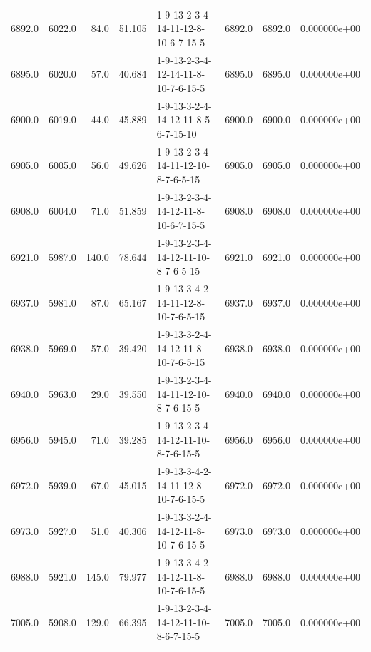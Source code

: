 \begin{tabular}{rrrrlrrr}
 6892.0 &  6022.0 &           84.0 &             51.105 &  1-9-13-2-3-4-14-11-12-8-10-6-7-15-5 &        6892.0 &          6892.0 &  0.000000e+00 \\
 6895.0 &  6020.0 &           57.0 &             40.684 &  1-9-13-2-3-4-12-14-11-8-10-7-6-15-5 &        6895.0 &          6895.0 &  0.000000e+00 \\
 6900.0 &  6019.0 &           44.0 &             45.889 &  1-9-13-3-2-4-14-12-11-8-5-6-7-15-10 &        6900.0 &          6900.0 &  0.000000e+00 \\
 6905.0 &  6005.0 &           56.0 &             49.626 &  1-9-13-2-3-4-14-11-12-10-8-7-6-5-15 &        6905.0 &          6905.0 &  0.000000e+00 \\
 6908.0 &  6004.0 &           71.0 &             51.859 &  1-9-13-2-3-4-14-12-11-8-10-6-7-15-5 &        6908.0 &          6908.0 &  0.000000e+00 \\
 6921.0 &  5987.0 &          140.0 &             78.644 &  1-9-13-2-3-4-14-12-11-10-8-7-6-5-15 &        6921.0 &          6921.0 &  0.000000e+00 \\
 6937.0 &  5981.0 &           87.0 &             65.167 &  1-9-13-3-4-2-14-11-12-8-10-7-6-5-15 &        6937.0 &          6937.0 &  0.000000e+00 \\
 6938.0 &  5969.0 &           57.0 &             39.420 &  1-9-13-3-2-4-14-12-11-8-10-7-6-5-15 &        6938.0 &          6938.0 &  0.000000e+00 \\
 6940.0 &  5963.0 &           29.0 &             39.550 &  1-9-13-2-3-4-14-11-12-10-8-7-6-15-5 &        6940.0 &          6940.0 &  0.000000e+00 \\
 6956.0 &  5945.0 &           71.0 &             39.285 &  1-9-13-2-3-4-14-12-11-10-8-7-6-15-5 &        6956.0 &          6956.0 &  0.000000e+00 \\
 6972.0 &  5939.0 &           67.0 &             45.015 &  1-9-13-3-4-2-14-11-12-8-10-7-6-15-5 &        6972.0 &          6972.0 &  0.000000e+00 \\
 6973.0 &  5927.0 &           51.0 &             40.306 &  1-9-13-3-2-4-14-12-11-8-10-7-6-15-5 &        6973.0 &          6973.0 &  0.000000e+00 \\
 6988.0 &  5921.0 &          145.0 &             79.977 &  1-9-13-3-4-2-14-12-11-8-10-7-6-15-5 &        6988.0 &          6988.0 &  0.000000e+00 \\
 7005.0 &  5908.0 &          129.0 &             66.395 &  1-9-13-2-3-4-14-12-11-10-8-6-7-15-5 &        7005.0 &          7005.0 &  0.000000e+00 \\

\end{tabular}
